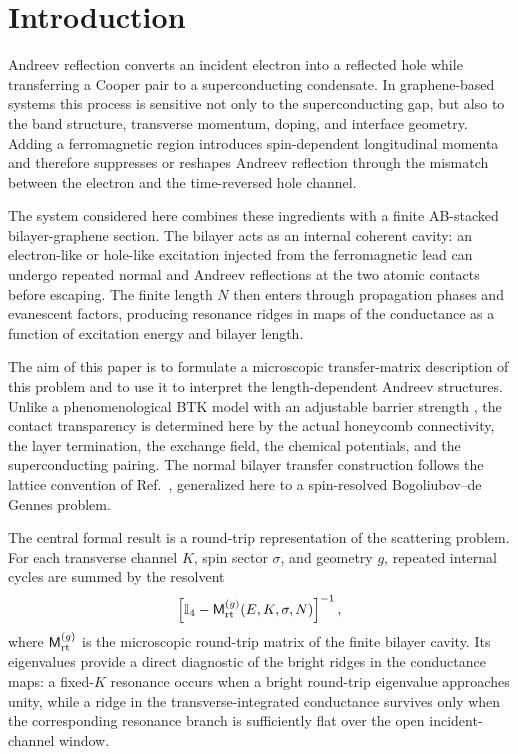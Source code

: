 \section{Introduction}
\label{sec:introduction}

Andreev reflection converts an incident electron into a reflected hole while transferring a Cooper pair to a superconducting condensate.  In graphene-based systems this process is sensitive not only to the superconducting gap, but also to the band structure, transverse momentum, doping, and interface geometry.  Adding a ferromagnetic region introduces spin-dependent longitudinal momenta and therefore suppresses or reshapes Andreev reflection through the mismatch between the electron and the time-reversed hole channel.

The system considered here combines these ingredients with a finite AB-stacked bilayer-graphene section.  The bilayer acts as an internal coherent cavity: an electron-like or hole-like excitation injected from the ferromagnetic lead can undergo repeated normal and Andreev reflections at the two atomic contacts before escaping.  The finite length $N$ then enters through propagation phases and evanescent factors, producing resonance ridges in maps of the conductance as a function of excitation energy and bilayer length.

The aim of this paper is to formulate a microscopic transfer-matrix description of this problem and to use it to interpret the length-dependent Andreev structures.  Unlike a phenomenological BTK model with an adjustable barrier strength \cite{btk1982}, the contact transparency is determined here by the actual honeycomb connectivity, the layer termination, the exchange field, the chemical potentials, and the superconducting pairing.  The normal bilayer transfer construction follows the lattice convention of Ref.~, generalized here to a spin-resolved Bogoliubov--de Gennes problem.

The central formal result is a round-trip representation of the scattering problem.  For each transverse channel $K$, spin sector $\sigma$, and geometry $g$, repeated internal cycles are summed by the resolvent
\begin{equation}
    \left[\mathbb I_4-\mathsf M_{\mathrm{rt}}^{(g)}(E,K,\sigma,N)\right]^{-1},
\end{equation}
where $\mathsf M_{\mathrm{rt}}^{(g)}$ is the microscopic round-trip matrix of the finite bilayer cavity.  Its eigenvalues provide a direct diagnostic of the bright ridges in the conductance maps: a fixed-$K$ resonance occurs when a bright round-trip eigenvalue approaches unity, while a ridge in the transverse-integrated conductance survives only when the corresponding resonance branch is sufficiently flat over the open incident-channel window.

